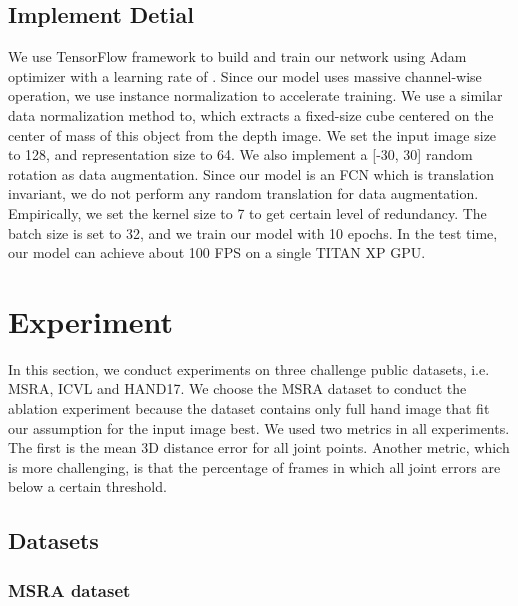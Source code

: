 \documentclass[journal]{IEEEtran}
\begin{document}
\subsection{Implement Detial}

We use TensorFlow framework to build and train our network using Adam optimizer with a learning rate of . 
Since our model uses massive channel-wise operation, we use instance normalization\cite{ulyanov2016instance} to accelerate training. 
We use a similar data normalization method to\cite{oberweger2017deepprior}, 
which extracts a fixed-size cube centered on the center of mass of this object from the depth image. 
We set the input image size  to 128, and representation size  to 64. 
We also implement a [-30, 30] random rotation as data augmentation. 
Since our model is an FCN which is translation invariant, we do not perform any random translation for data augmentation. 
Empirically, we set the kernel size  to 7 to get certain level of redundancy. 
The batch size is set to 32, and we train our model with 10 epochs. 
In the test time, our model can achieve about 100 FPS on a single TITAN XP GPU.













\section{Experiment}
\label{Experiment}

In this section, we conduct experiments on three challenge public datasets, i.e. MSRA, ICVL and HAND17. 
We choose the MSRA dataset to conduct the ablation experiment because the dataset contains only full hand image 
that fit our assumption for the input image best. 
We used two metrics in all experiments. The first is the mean 3D distance error for all joint points. 
Another metric, which is more challenging, is that the percentage of frames in which all joint errors are below a certain threshold.

\subsection{Datasets}

\subsubsection{MSRA dataset}
\end{document}
